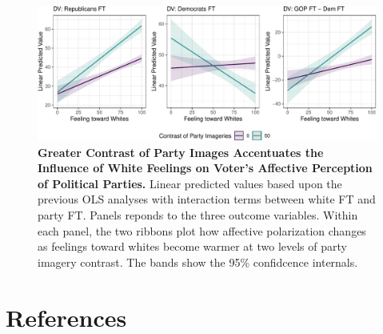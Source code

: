 \documentclass[
  12pt,
]{article}
\begin{document}
\begin{figure}[tb]

{\centering \includegraphics{local-images_files/figure-pdf/fig-mechanism-1.pdf}

}

\caption{\label{fig-mechanism}\textbf{Greater Contrast of Party Images
Accentuates the Influence of White Feelings on Voter's Affective
Perception of Political Parties.} Linear predicted values based upon the
previous OLS analyses with interaction terms between white FT and party
FT. Panels reponds to the three outcome variables. Within each panel,
the two ribbons plot how affective polarization changes as feelings
toward whites become warmer at two levels of party imagery contrast. The
bands show the 95\% confidcence internals.}

\end{figure}

\hypertarget{references}{%
\section*{References}\label{references}}
\end{document}

